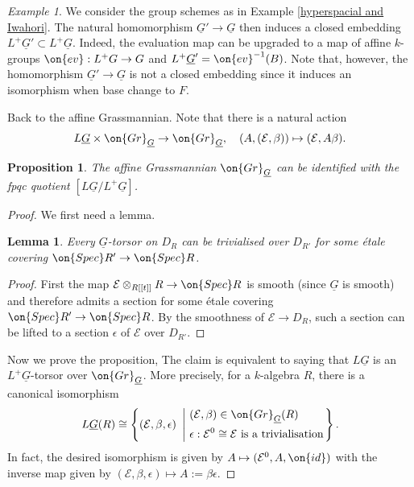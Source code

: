 \documentclass[]{pcmi}
\theoremstyle{plain}
\newtheorem{prop}[equation]{Proposition}
\newtheorem{lem}[equation]{Lemma}
\theoremstyle{remark}
\newtheorem{ex}[equation]{Example}
\theoremstyle{definition}
\newcommand{\mE}{{\mathcal E}}
\newcommand{\Gr}{{\on{Gr}}}
\newcommand{\Spec}{\on{Spec}}
\begin{document}
\begin{ex}\label{hyperspacial and Iwahori2}
We consider the group schemes as in Example \ref{hyperspacial and Iwahori}. The natural homomorphism $\underline G'\to \underline G$ then induces a closed embedding $L^+\underline G'\subset L^+\underline G$. Indeed, the evaluation map can be upgraded to a map of affine $k$-groups $\on{ev}:L^+G\to G$ and $L^+\underline G'=\on{ev}^{-1}(B)$. Note that, however, the homomorphism $\underline G'\to \underline G$ is not a closed embedding since it induces an isomorphism when base change to $F$.
\end{ex}

Back to the affine Grassmannian.  Note that there is a natural action
\begin{equation}\label{I:action}
L\underline G\times \Gr_{\underline G}\to \Gr_{\underline G},\quad (A, (\mE,\beta))\mapsto (\mE,A\beta).
\end{equation}

\begin{prop}\label{I:quotient}
The affine Grassmannian $\Gr_{\underline G}$ can be identified with the fpqc quotient $[L\underline G/L^+\underline G]$. 
\end{prop}
\begin{proof}
We first need a lemma.
\begin{lem}\label{et loc triv}
Every $\underline G$-torsor on $D_R$ can be trivialised over $D_{R'}$ for some \'etale covering $\Spec R'\to \Spec R$.
\end{lem}
\begin{proof}First the map $\mE\otimes_{R[[t]]}R\to\Spec R$ is smooth (since $\underline G$ is smooth) and therefore admits a section for some \'etale covering  $\Spec R'\to \Spec R$. By the smoothness of $\mE\to D_R$, such a section can be lifted to a section $\epsilon$ of $\mE$ over $D_{R'}$.
\end{proof}
Now we prove the proposition,
The claim is equivalent to saying that $L\underline G$ is an $L^+\underline G$-torsor over $\Gr_{\underline G}$. More precisely, for a $k$-algebra $R$, there is a canonical isomorphism
\[L\underline G(R)\cong\left\{(\mE,\beta, \epsilon)\ \left|\ \begin{split}&(\mE,\beta)\in \Gr_{\underline G}(R) \\
& \epsilon: \mE^0\cong \mE \mbox{ is a trivialisation}\end{split}\right.\right\}.\]
In fact, the desired isomorphism is given by $A\mapsto (\mE^0,A,\on{id})$ with the inverse map given by $(\mE,\beta,\epsilon)\mapsto A:=\beta\epsilon$.
\end{proof}
\end{document}
